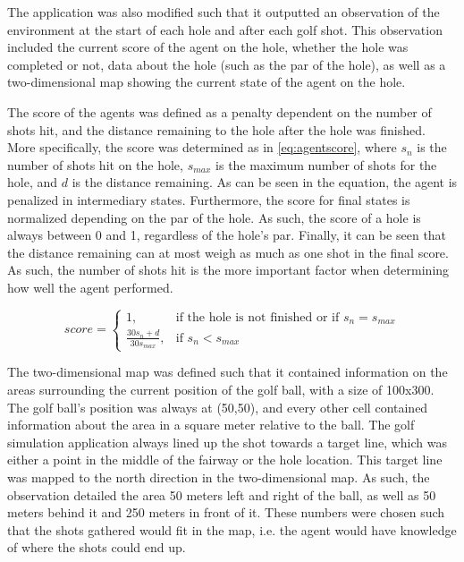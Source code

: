 \documentclass{kththesis}
\begin{document}
The application was also modified such that it outputted an observation of the environment at the start of each hole and after each golf shot. This observation included the current score of the agent on the hole, whether the hole was completed or not, data about the hole (such as the par of the hole), as well as a two-dimensional map showing the current state of the agent on the hole.

The score of the agents was defined as a penalty dependent on the number of shots hit, and the distance remaining to the hole after the hole was finished. More specifically, the score was determined as in \autoref{eq:agentscore}, where $s_n$ is the number of shots hit on the hole, $s_{max}$ is the maximum number of shots for the hole, and $d$ is the distance remaining. As can be seen in the equation, the agent is penalized in intermediary states. Furthermore, the score for final states is normalized depending on the par of the hole. As such, the score of a hole is always between 0 and 1, regardless of the hole's par. Finally, it can be seen that the distance remaining can at most weigh as much as one shot in the final score. As such, the number of shots hit is the more important factor when determining how well the agent performed. 

\begin{equation}
\label{eq:agentscore}
score = 
\begin{cases}
1,& \text{if the hole is not finished or if } s_n = s_{max}\\
\frac{30s_n + d}{30s_{max}},& \text{if } s_n < s_{max}
\end{cases}
\end{equation}

The two-dimensional map was defined such that it contained information on the areas surrounding the current position of the golf ball, with a size of 100x300. The golf ball's position was always at (50,50), and every other cell contained information about the area in a square meter relative to the ball. The golf simulation application always lined up the shot towards a target line, which was either a point in the middle of the fairway or the hole location. This target line was mapped to the north direction in the two-dimensional map. As such, the observation detailed the area 50 meters left and right of the ball, as well as 50 meters behind it and 250 meters in front of it. These numbers were chosen such that the shots gathered would fit in the map, i.e. the agent would have knowledge of where the shots could end up. 
\end{document}
